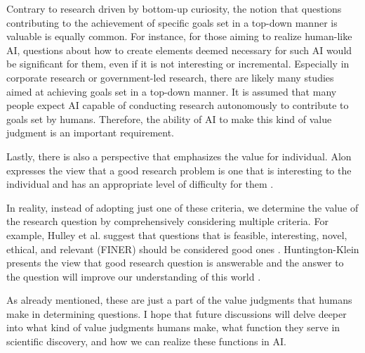 Contrary to research driven by bottom-up curiosity, the notion that questions contributing to the achievement of specific goals set in a top-down manner is valuable is equally common. For instance, for those aiming to realize human-like AI, questions about how to create elements deemed necessary for such AI would be significant for them, even if it is not interesting or incremental. Especially in corporate research or government-led research, there are likely many studies aimed at achieving goals set in a top-down manner. It is assumed that many people expect AI capable of conducting research autonomously to contribute to goals set by humans. Therefore, the ability of AI to make this kind of value judgment is an important requirement.

Lastly, there is also a perspective that emphasizes the value for individual. Alon expresses the view that a good research problem is one that is interesting to the individual and has an appropriate level of difficulty for them \cite{alon2009choose}.

In reality, instead of adopting just one of these criteria, we determine the value of the research question by comprehensively considering multiple criteria. For example, Hulley et al. suggest that questions that is feasible, interesting, novel, ethical, and relevant (FINER) should be considered good ones \cite{hulley2007designing}. Huntington-Klein presents the view that good research question is answerable and the answer to the question will improve our understanding of this world \cite{huntington2021effect}.

As already mentioned, these are just a part of the value judgments that humans make in determining questions. I hope that future discussions will delve deeper into what kind of value judgments humans make, what function they serve in scientific discovery, and how we can realize these functions in AI.



